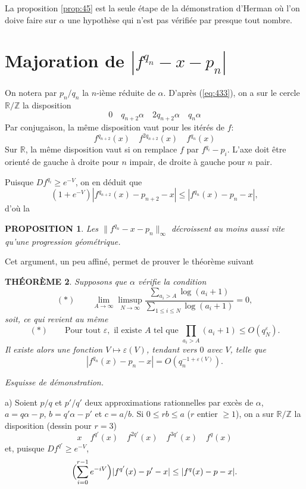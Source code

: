 \documentclass[12pt]{amsart}
\theoremstyle{plain}
\newtheorem{theoreme}{TH\'{E}OR\`{E}ME}[section]
\newtheorem{proposition}[theoreme]{PROPOSITION}
\theoremstyle{remark}
\begin{document}
La proposition \ref{prop:45} est la seule \'{e}tape de la d\'{e}monstration d'Herman o\`{u} l'on doive faire sur $\alpha$ une hypoth\`{e}se qui n'est pas v\'{e}rifi\'{e}e par presque tout nombre.

\section{Majoration de $|f^{q_{n}} - x - p_{n}|$}

On notera par $p_{n}/q_{n}$ la $n$-i\`{e}me r\'{e}duite de $\alpha$. D'apr\`{e}s (\ref{eq:433}), on a sur le cercle $\mathbb{R}/\mathbb{Z}$ la disposition
\[
0 \quad q_{n+2}\alpha \quad 2q_{n+2}\alpha \quad q_{n}\alpha
\]
Par conjugaison, la m\^{e}me disposition vaut pour les it\'{e}r\'{e}s de $f$:
\[
f^{q_{n+2}}(x) \quad f^{2q_{n+2}}(x) \quad f^{q_{n}}(x)
\]
Sur $\mathbb{R}$, la m\^{e}me disposition vaut si on remplace $f$ par $f^{q_{i}} - p_{i}$. L'axe doit \^{e}tre orient\'{e} de gauche \`{a} droite pour $n$ impair, de droite \`{a} gauche pour $n$ pair.

Puisque $Df^{q_{i}} \geq e^{-V}$, on en d\'{e}duit que
\[
(1 + e^{-V})|f^{q_{n+2}}(x) - p_{n+2} - x| \leq |f^{q_{n}}(x) - p_{n} - x| ,
\]
d'o\`{u} la

\begin{proposition}\label{prop:51}
Les $\|f^{q_{n}} - x - p_{n}\|_{\infty}$ d\'{e}croissent au moins aussi vite qu'une progression g\'{e}om\'{e}trique.
\end{proposition}

Cet argument, un peu affin\'{e}, permet de prouver le th\'{e}or\`{e}me suivant

\begin{theoreme}\label{thm:52}
Supposons que $\alpha$ v\'{e}rifie la condition
\[
(*) \qquad \lim_{A \to \infty} \limsup_{N \to \infty} \frac{\sum_{a_{i} > A} \log(a_{i} + 1)}{\sum_{1 \leq i \leq N} \log(a_{i} + 1)} = 0 ,
\]
soit, ce qui revient au m\^{e}me
\[
(*) \qquad \text{Pour tout } \varepsilon, \text{ il existe } A \text{ tel que } \prod_{a_{i} > A} (a_{i} + 1) \leq O(q_{N}^{\varepsilon}) .
\]
Il existe alors une fonction $V \mapsto \varepsilon(V)$, tendant vers $0$ avec $V$, telle que
\[
|f^{q_{n}}(x) - p_{n} - x| = O(q_{n}^{-1+\varepsilon(V)}) .
\]
\end{theoreme}

\textit{Esquisse de d\'{e}monstration.}

a) Soient $p/q$ et $p'/q'$ deux approximations rationnelles par exc\`{e}s de $\alpha$, $a = q\alpha - p$, $b = q'\alpha - p'$ et $c = a/b$. Si $0 \leq rb \leq a$ ($r$ entier $\geq 1$), on a sur $\mathbb{R}/\mathbb{Z}$ la disposition (dessin pour $r = 3$)
\[
x \quad f^{q'}(x) \quad f^{2q'}(x) \quad f^{3q'}(x) \quad f^{q}(x)
\]
et, puisque $Df^{q'} \geq e^{-V}$,
\begin{equation}\label{eq:521}
\Bigl(\sum_{i=0}^{r-1} e^{-iV}\Bigr)|f^{q'}(x) - p' - x| \leq |f^{q}(x) - p - x| .
\end{equation}
\end{document}
